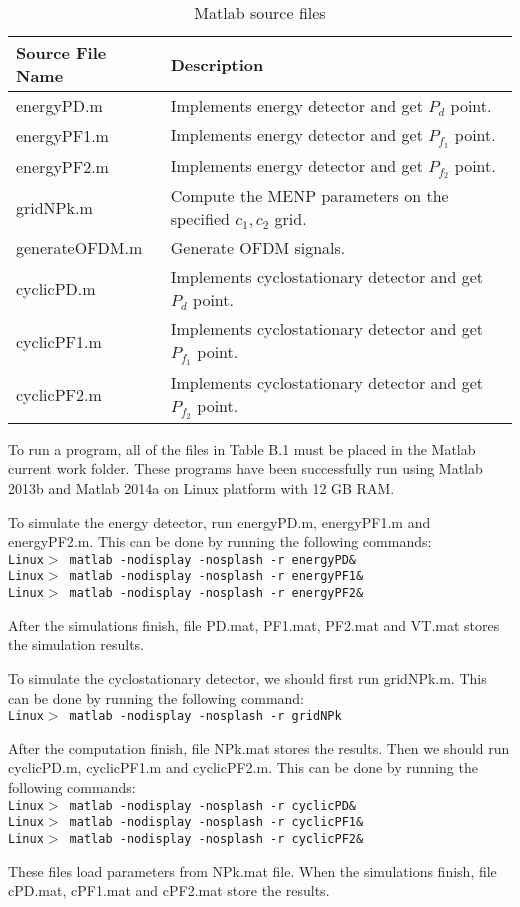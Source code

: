 \begin{table}[h]
\begin{tabular}{l|p{350pt}}
\hline
\hline
Source File Name                  & Description                                                                \\ \hline
energyPD.m                  &       Implements energy detector and get $P_d$ point. \\
energyPF1.m                 &        Implements energy detector and get $P_{f_1}$ point. \\
energyPF2.m                 &        Implements energy detector and get $P_{f_2}$ point. \\
gridNPk.m                   &       Compute the MENP parameters on the specified $c_1, c_2$ grid.\\
generateOFDM.m              &       Generate OFDM signals.                          \\
cyclicPD.m                  &       Implements cyclostationary detector and get $P_d$ point.    \\
cyclicPF1.m                 &       Implements cyclostationary detector and get $P_{f_1}$ point.    \\
cyclicPF2.m                 &        Implements cyclostationary detector and get $P_{f_2}$ point.    \\
\hline
\end{tabular}
\label{filelist}
\caption{Matlab source files}
\end{table}

To run a program, all of the files in Table B.1 must be placed in the Matlab current work folder. These programs have been successfully run using Matlab 2013b and Matlab 2014a on Linux platform with 12 GB RAM.  

To simulate the energy detector, run energyPD.m, energyPF1.m and energyPF2.m. This can be done by running the following commands:
\\\texttt{Linux$>$ matlab -nodisplay -nosplash -r energyPD\&}
\\\texttt{Linux$>$ matlab -nodisplay -nosplash -r energyPF1\&}
\\\texttt{Linux$>$ matlab -nodisplay -nosplash -r energyPF2\&}

After the simulations finish, file PD.mat, PF1.mat, PF2.mat and VT.mat  stores the simulation results.

To simulate the cyclostationary detector, we should first run gridNPk.m. This can be done by running the following command:
\\\texttt{Linux$>$ matlab -nodisplay -nosplash -r gridNPk}

After the computation finish, file NPk.mat stores the results. Then we should run cyclicPD.m, cyclicPF1.m and cyclicPF2.m. This can be done by running the following commands:
\\\texttt{Linux$>$ matlab -nodisplay -nosplash -r cyclicPD\&}
\\\texttt{Linux$>$ matlab -nodisplay -nosplash -r cyclicPF1\&}
\\\texttt{Linux$>$ matlab -nodisplay -nosplash -r cyclicPF2\&}

These files load parameters from NPk.mat file. When the simulations finish, file cPD.mat, cPF1.mat and cPF2.mat store the results. 
